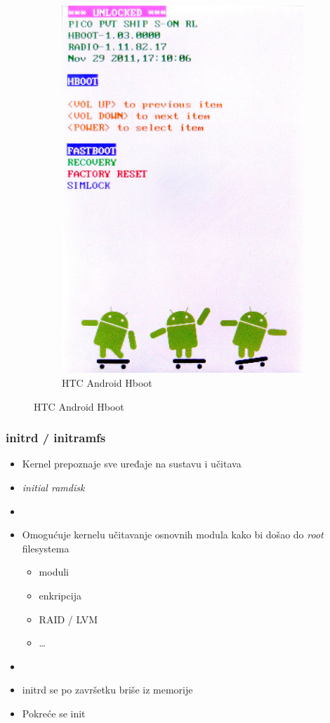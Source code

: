 \documentclass[t]{beamer}
\begin{document}
\begin{frame}
\begin{figure}
\begin{subfigure}[f]{0.3\textwidth}
			\includegraphics[width=\textwidth]{androidHboot.jpg}
			\caption*{HTC Android Hboot}
		\end{subfigure}
	\end{figure}
\end{frame}

\begin{frame}
	\frametitle{initrd / initramfs}
	\begin{itemize}
		\item Kernel prepoznaje sve uređaje na sustavu i učitava
		\item[] \emph{initial ramdisk}
		\item[]
		\item Omogućuje kernelu učitavanje osnovnih modula kako bi došao do \emph{root} filesystema
		\begin{itemize}
			\item moduli
			\item enkripcija
			\item RAID / LVM
			\item \dots
		\end{itemize}
		\item[]
		\item initrd se po završetku briše iz memorije
		\item Pokreće se init
	\end{itemize}
\end{frame}
\end{document}
